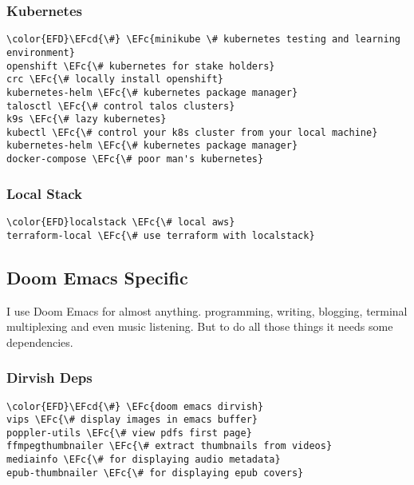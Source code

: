 \documentclass[14pt]{article}
\newcommand{\EFc}[1]{\textcolor{EFc}{#1}} %
\newcommand{\EFcd}[1]{\textcolor{EFcd}{#1}} %
\begin{document}
\subsubsection{Kubernetes}
\label{sec:org586066f}
\begin{Code}
\begin{Verbatim}
\color{EFD}\EFcd{\#} \EFc{minikube \# kubernetes testing and learning environment}
openshift \EFc{\# kubernetes for stake holders}
crc \EFc{\# locally install openshift}
kubernetes-helm \EFc{\# kubernetes package manager}
talosctl \EFc{\# control talos clusters}
k9s \EFc{\# lazy kubernetes}
kubectl \EFc{\# control your k8s cluster from your local machine}
kubernetes-helm \EFc{\# kubernetes package manager}
docker-compose \EFc{\# poor man's kubernetes}

\end{Verbatim}
\end{Code}
\subsubsection{Local Stack}
\label{sec:org29b8062}
\begin{Code}
\begin{Verbatim}
\color{EFD}localstack \EFc{\# local aws}
terraform-local \EFc{\# use terraform with localstack}

\end{Verbatim}
\end{Code}
\subsection{Doom Emacs Specific}
\label{sec:org0238b39}
I use Doom Emacs for almost anything. programming, writing, blogging, terminal multiplexing and even music listening. But to do all those things it needs some dependencies.
\subsubsection{Dirvish Deps}
\label{sec:org9dc1e6e}
\begin{Code}
\begin{Verbatim}
\color{EFD}\EFcd{\#} \EFc{doom emacs dirvish}
vips \EFc{\# display images in emacs buffer}
poppler-utils \EFc{\# view pdfs first page}
ffmpegthumbnailer \EFc{\# extract thumbnails from videos}
mediainfo \EFc{\# for displaying audio metadata}
epub-thumbnailer \EFc{\# for displaying epub covers}

\end{Verbatim}
\end{Code}
\end{document}

